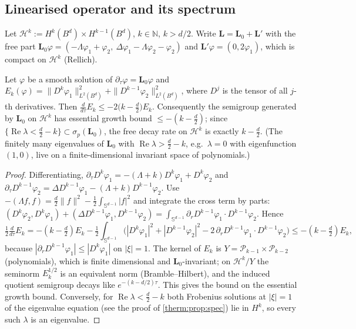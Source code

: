 \subsection{Linearised operator and its spectrum}
\label{therm:sec:spectrum}

Let $\mathcal H^k:=H^k(B^d)\times H^{k-1}(B^d)$, $k\in\mathbb{N}$, $k>d/2$.  Write
$\mathbf L=\mathbf L_0+\mathbf L'$ with the free part
$\mathbf L_0\varphi=(-\Lambda\varphi_1+\varphi_2,\ \Delta\varphi_1-\Lambda\varphi_2-\varphi_2)$
and $\mathbf L'\varphi=(0,2\varphi_1)$, which is compact on $\mathcal H^k$ (Rellich).

\begin{lemma}\label{therm:lem:free}
Let $\varphi$ be a smooth solution of $\partial_\tau\varphi=\mathbf L_0\varphi$ and
$E_k(\varphi)=\|D^k\varphi_1\|_{L^2(B^d)}^2+\|D^{k-1}\varphi_2\|_{L^2(B^d)}^2$, where $D^j$ is the
tensor of all $j$-th derivatives.  Then
$\frac{d}{d\tau}E_k\le-2\bigl(k-\tfrac d2\bigr)E_k$.  Consequently the semigroup
generated by $\mathbf L_0$ on $\mathcal H^k$ has essential growth bound
$\le-(k-\tfrac d2)$; since $\{\operatorname{Re}\lambda<\tfrac d2-k\}\subset\sigma_p(\mathbf L_0)$, the
free decay rate on $\mathcal H^k$ is exactly $k-\tfrac d2$.  (The finitely many eigenvalues of
$\mathbf L_0$ with $\operatorname{Re}\lambda>\frac d2-k$, e.g.\ $\lambda=0$ with eigenfunction $(1,0)$, live on a
finite-dimensional invariant space of polynomials.)
\end{lemma}

\begin{proof}
Differentiating, $\partial_\tau D^k\varphi_1=-(\Lambda+k)D^k\varphi_1+D^k\varphi_2$ and
$\partial_\tau D^{k-1}\varphi_2=\Delta D^{k-1}\varphi_1-(\Lambda+k)D^{k-1}\varphi_2$.  Use
$-(\Lambda f,f)=\tfrac d2\|f\|^2-\tfrac12\int_{\mathbb S^{d-1}}|f|^2$ and integrate the
cross term by parts: $(D^k\varphi_2,D^k\varphi_1)+(\Delta D^{k-1}\varphi_1,D^{k-1}\varphi_2)
=\int_{\mathbb S^{d-1}}\partial_rD^{k-1}\varphi_1\cdot D^{k-1}\varphi_2$.  Hence
\[
\tfrac12\tfrac{d}{d\tau}E_k=-(k-\tfrac d2)E_k-\tfrac12\!\int_{\mathbb S^{d-1}}\!\bigl(|D^k\varphi_1|^2+|D^{k-1}\varphi_2|^2
-2\,\partial_rD^{k-1}\varphi_1\cdot D^{k-1}\varphi_2\bigr)\le-(k-\tfrac d2)E_k,
\]
because $|\partial_rD^{k-1}\varphi_1|\le|D^k\varphi_1|$ on $|\xi|=1$.  The kernel of $E_k$ is
$Y=\mathcal P_{k-1}\times\mathcal P_{k-2}$ (polynomials), which is finite dimensional
and $\mathbf L_0$-invariant; on $\mathcal H^k/Y$ the seminorm $E_k^{1/2}$ is an
equivalent norm (Bramble--Hilbert), and the induced quotient semigroup decays
like $e^{-(k-d/2)\tau}$.  This gives the bound on the essential growth bound.
Conversely, for $\operatorname{Re}\lambda<\tfrac d2-k$ both Frobenius solutions at $|\xi|=1$
of the eigenvalue equation (see the proof of \cref{therm:prop:spec}) lie in
$H^k$, so every such $\lambda$ is an eigenvalue.
\end{proof}

